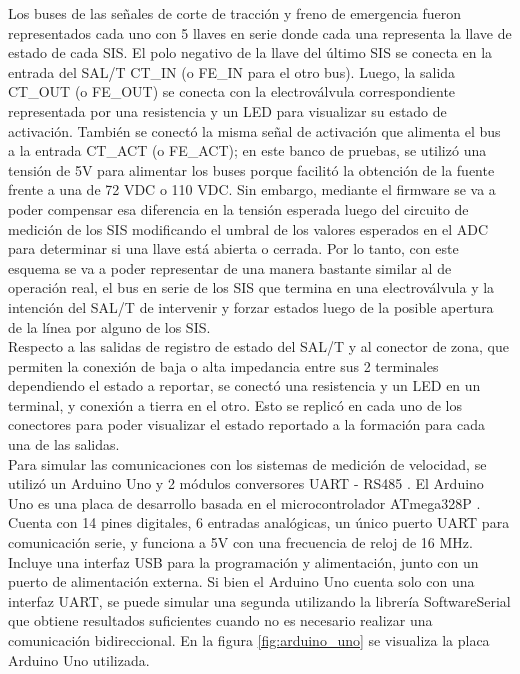 Los buses de las señales de corte de tracción y freno de emergencia fueron representados cada uno con 5 llaves en serie donde cada una representa la llave de estado de cada SIS. El polo negativo de la llave del último SIS se conecta en la entrada del SAL/T CT\_IN (o FE\_IN para el otro bus). Luego, la salida CT\_OUT (o FE\_OUT) se conecta con la electroválvula correspondiente representada por una resistencia y un LED para visualizar su estado de activación. También se conectó la misma señal de activación que alimenta el bus a la entrada CT\_ACT (o FE\_ACT); en este banco de pruebas, se utilizó una tensión de 5V para alimentar los buses porque facilitó la obtención de la fuente frente a una de 72 VDC o 110 VDC. Sin embargo, mediante el firmware se va a poder compensar esa diferencia en la tensión esperada luego del circuito de medición de los SIS modificando el umbral de los valores esperados en el ADC para determinar si una llave está abierta o cerrada. Por lo tanto, con este esquema se va a poder representar de una manera bastante similar al de operación real, el bus en serie de los SIS que termina en una electroválvula y la intención del SAL/T de intervenir y forzar estados luego de la posible apertura de la línea por alguno de los SIS. \\

Respecto a las salidas de registro de estado del SAL/T y al conector de zona, que permiten la conexión de baja o alta impedancia entre sus 2 terminales dependiendo el estado a reportar, se conectó una resistencia y un LED en un terminal, y conexión a tierra en el otro. Esto se replicó en cada uno de los conectores para poder visualizar el estado reportado a la formación para cada una de las salidas. \\ 


Para simular las comunicaciones con los sistemas de medición de velocidad, se utilizó un Arduino Uno \cite{arduino_uno} y 2 módulos conversores UART - RS485 \cite{conversor_rs485}. El Arduino Uno es una placa de desarrollo basada en el microcontrolador ATmega328P \cite{atmega328}. Cuenta con 14 pines digitales, 6 entradas analógicas, un único puerto UART para comunicación serie, y funciona a 5V con una frecuencia de reloj de 16 MHz. Incluye una interfaz USB para la programación y alimentación, junto con un puerto de alimentación externa. Si bien el Arduino Uno cuenta solo con una interfaz UART, se puede simular una segunda utilizando la librería SoftwareSerial \cite{swSerial} que obtiene resultados suficientes cuando no es necesario realizar una comunicación bidireccional. En la figura \ref{fig:arduino_uno} se visualiza la placa Arduino Uno utilizada. 

